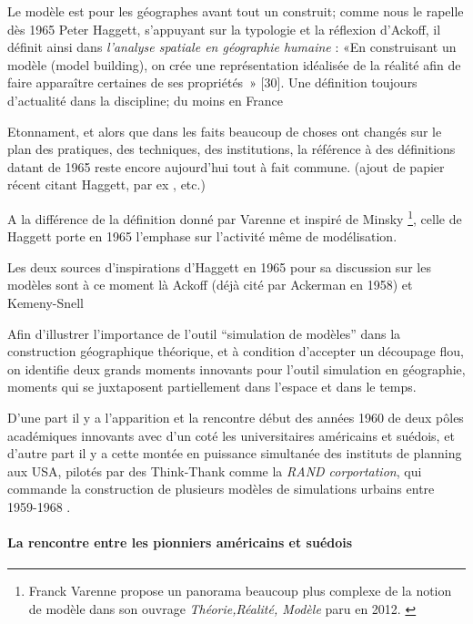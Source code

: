 Le modèle est pour les géographes avant tout un construit; comme nous le rapelle dès 1965 Peter Haggett, s'appuyant sur la typologie et la réflexion d'Ackoff, il définit ainsi dans \textit{l'analyse spatiale en géographie humaine} : «En construisant un modèle (model building), on crée une représentation idéalisée de la réalité afin de faire apparaître certaines de ses propriétés » [30]\autocite{Haggett1965}. Une définition toujours d'actualité dans la discipline; du moins en France \autocite{Brunet2000} \autocite[295]{Bailly1995} \autocite{Dastes2001}

Etonnament, et alors que dans les faits beaucoup de choses ont changés sur le plan des pratiques, des techniques, des institutions, la référence à des définitions datant de 1965 reste encore aujourd'hui tout à fait commune. (ajout de papier récent citant Haggett, par ex \autocite{Antony2013}, \autocite{Dastes2001} etc.)

A la différence de la définition donné par Varenne et inspiré de Minsky \footnote{Franck Varenne propose un panorama beaucoup plus complexe de la notion de modèle dans son ouvrage \textit{Théorie,Réalité, Modèle} paru en 2012. \autocite{Varenne2012}}, celle de Haggett porte en 1965 l'emphase sur l'activité même de modélisation. 

Les deux sources d'inspirations d'Haggett \autocite[106]{Berry1963} en 1965 pour sa discussion sur les modèles sont à ce moment là Ackoff \autocite{Ackoff1962} (déjà cité par Ackerman en 1958) et Kemeny-Snell \autocite{Kemeny1962}

Afin d'illustrer l'importance de l'outil \enquote{simulation de modèles} dans la construction géographique théorique, et à condition d'accepter un découpage flou, on identifie deux grands moments innovants pour l'outil simulation en géographie, moments qui se juxtaposent partiellement dans l'espace et dans le temps.

D'une part il y a l'apparition et la rencontre début des années 1960 de deux pôles académiques innovants avec d'un coté les universitaires américains et suédois, et d'autre part il y a cette montée en puissance simultanée des instituts de planning aux USA, pilotés par des Think-Thank comme la \textit{RAND corportation}, qui commande la construction de plusieurs modèles de simulations urbains entre 1959-1968 \autocite[307]{Batty1976}. 

\paragraph{La rencontre entre les pionniers américains et suédois}

